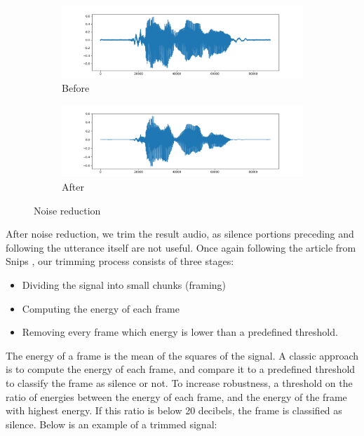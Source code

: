     \begin{figure}[h]
        \centering
        \begin{subfigure}{0.9\textwidth}
        \includegraphics[width = \linewidth]{img/Figure_1.png}
        \caption{Before}
        \label{fig:noise1}
        \end{subfigure}
        
        \begin{subfigure}{0.9\textwidth}
        \includegraphics[width = \linewidth]{img/Figure_2.png}
        \caption{After}
        \label{fig:noise2}
        \end{subfigure}
    \caption{Noise reduction}
    \label{fig:noise}
    \end{figure}
    
    After noise reduction, we trim the result audio, as silence portions preceding and following the utterance itself are not useful. Once again following the article from Snips \cite{snips}, our trimming process consists of three stages:
    \begin{itemize}
        \item Dividing the signal into small chunks (framing)
        \item Computing the energy of each frame
        \item Removing every frame which energy is lower than a predefined threshold.
    \end{itemize}
    The energy of a frame is the mean of the squares of the signal. A classic approach is to compute the energy of each frame, and compare it to a predefined threshold to classify the frame as silence or not. To increase robustness, a threshold on the ratio of energies between the energy of each frame, and the energy of the frame with highest energy. If this ratio is below 20 decibels, the frame is classified as silence. Below is an example of a trimmed signal:
    
